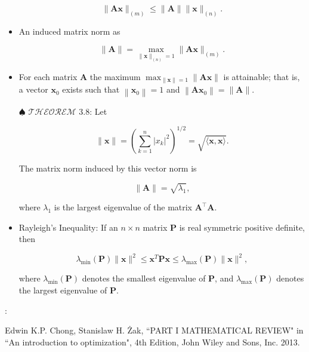 \documentclass[12pt,thmsa]{article}
\begin{document}
\begin{itemize}
	\begin{equation*}
		\|\boldsymbol{A} \boldsymbol{x}\|_{(m)} \leq\|\boldsymbol{A}\|\|\boldsymbol{x}\|_{(n)}.
	\end{equation*}

	\item An induced matrix norm as
	
	\begin{equation*}
		\|\boldsymbol{A}\|=\max _{\|\boldsymbol{x}\|_{(n)}=1}\|\boldsymbol{A} \boldsymbol{x}\|_{(m)}.
	\end{equation*}

	\item For each matrix \(\boldsymbol{A}\) the maximum \(\max _{\|\boldsymbol{x}\|=1}\|\boldsymbol{A} \boldsymbol{x}\|\) is attainable; that is, a vector \(\boldsymbol{x}_{0}\) exists such that \(\left\|\boldsymbol{x}_{0}\right\|=1\) and \(\left\|\boldsymbol{A} \boldsymbol{x}_{0}\right\|=\|\boldsymbol{A}\|\).
	
	\item[\(\spadesuit\)] \(\mathscr{THEOREM}\) 3.8: Let
	
	\begin{equation*}
		\|\boldsymbol{x}\|=\left(\sum_{k=1}^{n}\left|x_{k}\right|^{2}\right)^{1 / 2}=\sqrt{\langle\boldsymbol{x}, \boldsymbol{x}\rangle}.
	\end{equation*}
	
	The matrix norm induced by this vector norm is
	
	\begin{equation*}
		\|\boldsymbol{A}\|=\sqrt{\lambda_{1}},
	\end{equation*}
	
	where \(\lambda_{1}\) is the largest eigenvalue of the matrix \(\boldsymbol{A}^{\top} \boldsymbol{A}\).
	
	\item Rayleigh's Inequality: If an \(n \times n\) matrix \(\boldsymbol{P}\) is real symmetric positive definite, then
	
	\begin{equation*}
		\lambda_{\min }(\boldsymbol{P})\|\boldsymbol{x}\|^{2} \leq \boldsymbol{x}^{T} \boldsymbol{P} \boldsymbol{x} \leq \lambda_{\max }(\boldsymbol{P})\|\boldsymbol{x}\|^{2},
	\end{equation*}
	
	where \(\lambda_{\min }(\boldsymbol{P})\) denotes the smallest eigenvalue of \(\boldsymbol{P}\), and \(\lambda_{\max }(\boldsymbol{P})\) denotes the largest eigenvalue of \(\boldsymbol{P}\). 
	
\end{itemize}

\medskip

\noindent
[Ref]: 

Edwin K.P. Chong, Stanislaw H. Żak, ``PART I MATHEMATICAL REVIEW" in ``An introduction to optimization", 4th Edition, John Wiley and Sons, Inc. 2013.
\end{document}
